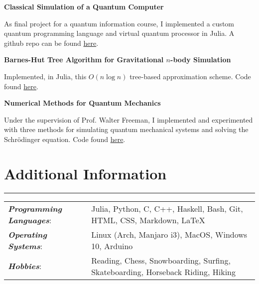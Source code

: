 \documentclass{article}
\newcommand{\myline}{\rule[\baselineskip]{\linewidth}{1pt}}
\begin{document}
\large\textbf{Classical Simulation of a Quantum Computer}
\normalsize

\begin{compactitem}
\item As final project for a quantum information course, I implemented a custom quantum programming language and virtual quantum processor in Julia. A github repo can be found \href{https://github.com/aarontrowbridge/QuIPS}{here}.
\end{compactitem}


\large\textbf{Barnes-Hut Tree Algorithm for Gravitational $n$-body Simulation}
\normalsize

\begin{compactitem}
\item Implemented, in Julia, this $O(n \log n)$ tree-based approximation scheme. Code found \href{https://github.com/aarontrowbridge/Gravity}{here}. 
\end{compactitem}


\large\textbf{Numerical Methods for Quantum Mechanics}
\normalsize

\begin{compactitem}
\item Under the supervision of Prof. Walter Freeman, I implemented and experimented with three methods for simulating quantum mechanical systems and solving the Schr\"odinger equation. Code found \href{https://github.com/aarontrowbridge/Quantum}{here}. 
\end{compactitem}



\section{Additional Information}
\myline

\normalsize

\begin{tabular}{ll}
\textbf{\textit{Programming Languages}}: & Julia, Python, C, C++,  Haskell, Bash, Git, HTML, CSS, Markdown, \LaTeX \\
\textbf{\textit{Operating Systems}}: & Linux (Arch, Manjaro i3), MacOS, Windows 10, Arduino \\ 
\textbf{\textit{Hobbies}}: & Reading, Chess, Snowboarding, Surfing, Skateboarding, Horseback Riding, Hiking \\    
\end{tabular}
\end{document}
